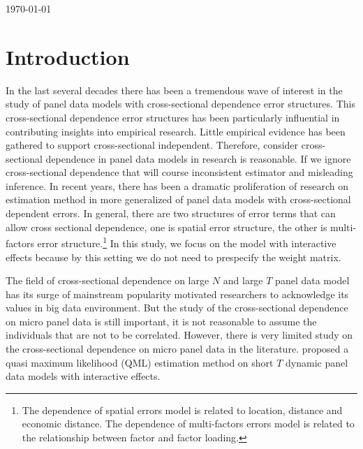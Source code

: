 \documentclass[12pt,a4paper,hyperref]{article}
\begin{document}
\begin{titlepage}


{\large \today}\\[2cm] %


\vfill %

\end{titlepage}

\newpage
\tableofcontents
\newpage
\section{Introduction}


In the last several decades there has been a tremendous wave of interest in the study of panel data models with cross-sectional dependence error structures. This cross-sectional dependence error structures has been particularly influential in contributing insights into empirical research. Little empirical evidence has been gathered to support cross-sectional independent. Therefore, consider cross-sectional dependence in panel data models in research is reasonable. If we ignore cross-sectional dependence that will course inconsistent estimator and misleading inference. In recent years, there has been a dramatic proliferation of research on estimation method in more generalized of panel data models with cross-sectional dependent errors. In general, there are two structures of error terms that can allow cross sectional dependence, one is spatial error structure, the other is multi-factors error structure.\footnote{The dependence of spatial errors model is related to location, distance and economic distance. The dependence of multi-factors errors model is related to the relationship between factor and factor loading. } In this study, we focus on the model with interactive effects because by this setting we do not need to prespecify the weight matrix.

The field of cross-sectional dependence on large $N$ and large $T$ panel data model has its surge of mainstream popularity motivated researchers to acknowledge its values in big data environment. But the study of the cross-sectional dependence on micro panel data is still important, it is not reasonable to assume the individuals that are not to be correlated.
 However, there is very limited study on the cross-sectional dependence on micro panel data in the literature. \citet{Hayakawa:2018} proposed a quasi maximum likelihood (QML) estimation method on short $T$ dynamic panel data models with interactive effects.
\end{document}
